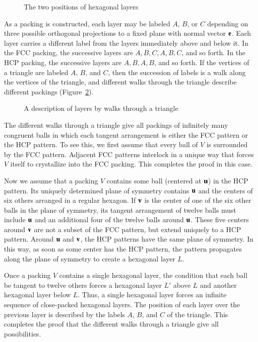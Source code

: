 \begin{figure}[htb]
  \centering
  \caption{The two positions of hexagonal layers}
  \label{fig:two-holes}
\end{figure}

As a packing is constructed, each layer may be labeled
$A$, $B$, or $C$ depending on three possible orthogonal projections to a fixed plane
with normal vector ${\mathbf e}$.
Each layer carries a different label from the layers immediately
above and below it.  In the FCC packing, the successive layers are
$A,B,C,A,B,C$, and so forth.  In the HCP packing, the successive layers are
$A,B,A,B$, and so forth.  If the vertices of a triangle are labeled $A$, $B$, and $C$,
then the succession of labels is a
walk along the vertices of the triangle, and different walks through the
triangle describe different packings (Figure~\ref{fig:fcc-tri}).

\begin{figure}[htb]
  \centering
  \caption{A description of layers by walks through a triangle}
  \label{fig:fcc-tri}
\end{figure}

The different walks through a triangle give all packings of infinitely
many congruent balls in which each tangent arrangement is
either the FCC pattern  or the HCP pattern.  To see
this, we first assume that every ball of $V$ is surrounded by the FCC pattern.  
Adjacent FCC patterns interlock in a unique way
that forces $V$ itself to crystallize into the
FCC packing.  This completes the proof in this case.

Now we assume that a packing $V$ contains some ball (centered at ${\mathbf u}$)
in the HCP pattern. Its uniquely determined
plane of symmetry contains ${\mathbf u}$ and the centers of six
others arranged in a regular hexagon. If ${\mathbf v}$ is the center of one of
the six other balls in the plane of symmetry, its  tangent arrangement
of twelve balls must include ${\mathbf u}$ and an additional four of the
twelve balls around ${\mathbf u}$. These five centers around ${\mathbf v}$ are not a
subset of the FCC pattern, but  extend uniquely to
a HCP pattern.   Around ${\mathbf u}$ and ${\mathbf v}$, the HCP patterns  have the same
plane of symmetry. In this way, as
soon as some center has the HCP pattern, the pattern
propagates along the plane of symmetry to create a hexagonal layer
$L$.

Once a packing $V$ contains a single hexagonal layer, the condition
that each ball be tangent to twelve others forces a hexagonal layer
$L'$ above $L$ and another hexagonal layer below $L$.  Thus, a single
hexagonal layer forces an infinite sequence of close-packed hexagonal
layers.  The position of each layer over the previous layer is described 
by the labels $A$, $B$, and $C$ of the triangle.
This completes the proof that the different walks through a triangle give
all possibilities.



